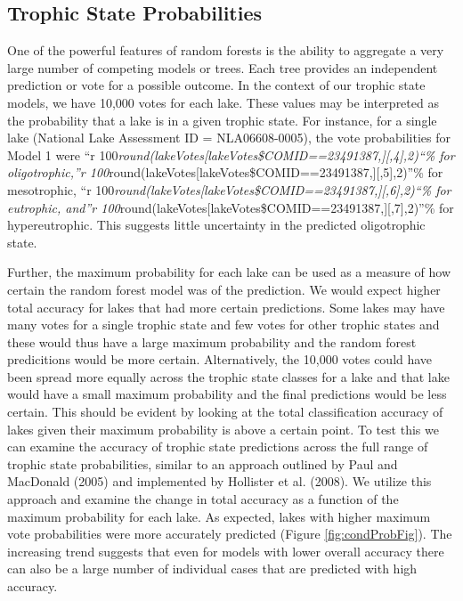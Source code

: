 \documentclass[11pt,]{article}
\begin{document}
\subsection{Trophic State
Probabilities}\label{trophic-state-probabilities}

One of the powerful features of random forests is the ability to
aggregate a very large number of competing models or trees. Each tree
provides an independent prediction or vote for a possible outcome. In
the context of our trophic state models, we have 10,000 votes for each
lake. These values may be interpreted as the probability that a lake is
in a given trophic state. For instance, for a single lake (National Lake
Assessment ID = NLA06608-0005), the vote probabilities for Model 1 were
``r
100\emph{round(lakeVotes{[}lakeVotes\$COMID==23491387,{]}{[},4{]},2)``\%
for oligotrophic,''r
100}round(lakeVotes{[}lakeVotes\$COMID==23491387,{]}{[},5{]},2)''\% for
mesotrophic, ``r
100\emph{round(lakeVotes{[}lakeVotes\$COMID==23491387,{]}{[},6{]},2)``\%
for eutrophic, and''r
100}round(lakeVotes{[}lakeVotes\$COMID==23491387,{]}{[},7{]},2)''\% for
hypereutrophic. This suggests little uncertainty in the predicted
oligotrophic state.

Further, the maximum probability for each lake can be used as a measure
of how certain the random forest model was of the prediction. We would
expect higher total accuracy for lakes that had more certain
predictions. Some lakes may have many votes for a single trophic state
and few votes for other trophic states and these would thus have a large
maximum probability and the random forest predicitions would be more
certain. Alternatively, the 10,000 votes could have been spread more
equally across the trophic state classes for a lake and that lake would
have a small maximum probability and the final predictions would be less
certain. This should be evident by looking at the total classification
accuracy of lakes given their maximum probability is above a certain
point. To test this we can examine the accuracy of trophic state
predictions across the full range of trophic state probabilities,
similar to an approach outlined by Paul and MacDonald (2005) and
implemented by Hollister et al. (2008). We utilize this approach and
examine the change in total accuracy as a function of the maximum
probability for each lake. As expected, lakes with higher maximum vote
probabilities were more accurately predicted (Figure
\ref{fig:condProbFig}). The increasing trend suggests that even for
models with lower overall accuracy there can also be a large number of
individual cases that are predicted with high accuracy.
\end{document}
